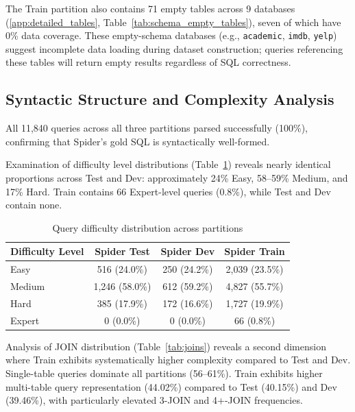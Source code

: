 \documentclass[print]{einformatica}
\begin{document}
The Train partition also contains 71 empty tables across 9 databases (\ref{app:detailed_tables}, Table~\ref{tab:schema_empty_tables}), seven of which have 0\% data coverage. These empty-schema databases (e.g., \texttt{academic}, \texttt{imdb}, \texttt{yelp}) suggest incomplete data loading during dataset construction; queries referencing these tables will return empty results regardless of SQL correctness.

\subsection{Syntactic Structure and Complexity Analysis}\label{sec:syntax_results}

All 11,840 queries across all three partitions parsed successfully (100\%), confirming that Spider's gold SQL is syntactically well-formed.

Examination of difficulty level distributions (Table~\ref{tab:difficulty}) reveals nearly identical proportions across Test and Dev: approximately 24\% Easy, 58--59\% Medium, and 17\% Hard. Train contains 66 Expert-level queries (0.8\%), while Test and Dev contain none.

\begin{table}[ht]
    \caption{Query difficulty distribution across partitions}
    \label{tab:difficulty}
    \centering
    \footnotesize
    \begin{tabular}{lccc}
        \toprule
        \textbf{Difficulty Level} & \textbf{Spider Test} & \textbf{Spider Dev} & \textbf{Spider Train} \\
        \midrule
        Easy & 516 (24.0\%) & 250 (24.2\%) & 2,039 (23.5\%) \\
        Medium & 1,246 (58.0\%) & 612 (59.2\%) & 4,827 (55.7\%) \\
        Hard & 385 (17.9\%) & 172 (16.6\%) & 1,727 (19.9\%) \\
        Expert & 0 (0.0\%) & 0 (0.0\%) & 66 (0.8\%) \\
        \bottomrule
    \end{tabular}
\end{table}

Analysis of JOIN distribution (Table~\ref{tab:joins}) reveals a second dimension where Train exhibits systematically higher complexity compared to Test and Dev. Single-table queries dominate all partitions (56--61\%). Train exhibits higher multi-table query representation (44.02\%) compared to Test (40.15\%) and Dev (39.46\%), with particularly elevated 3-JOIN and 4+-JOIN frequencies.
\end{document}
